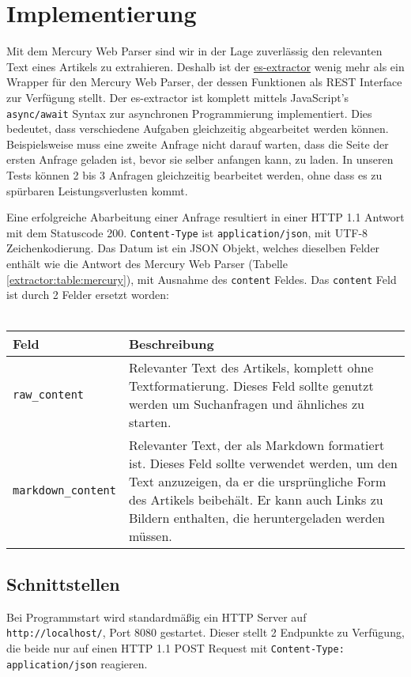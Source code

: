 \section{Implementierung} \label{extractor:sec:impl}
Mit dem Mercury Web Parser sind wir in der Lage zuverlässig den relevanten Text eines Artikels zu extrahieren.
Deshalb ist der \hyperref{https://github.com/elastifeed/es-extractor/}{}{}{es-extractor} wenig mehr als ein Wrapper für den Mercury Web Parser, der dessen Funktionen als REST Interface zur Verfügung stellt. Der es-extractor ist komplett mittels JavaScript's \texttt{async/await} Syntax zur asynchronen Programmierung implementiert. Dies bedeutet, dass verschiedene Aufgaben gleichzeitig abgearbeitet werden können. Beispielsweise muss eine zweite Anfrage nicht darauf warten, dass die Seite der ersten Anfrage geladen ist, bevor sie selber anfangen kann, zu laden. In unseren Tests können 2 bis 3 Anfragen gleichzeitig bearbeitet werden, ohne dass es zu spürbaren Leistungsverlusten kommt. \par
Eine erfolgreiche Abarbeitung einer Anfrage resultiert in einer HTTP 1.1 Antwort mit dem Statuscode 200. \verb|Content-Type| ist \verb|application/json|, mit UTF-8 Zeichenkodierung. Das Datum ist ein \ac{JSON} Objekt, welches dieselben Felder enthält wie die Antwort des Mercury Web Parser (Tabelle \ref{extractor:table:mercury}), mit Ausnahme des \verb|content| Feldes. Das \verb|content| Feld ist durch 2 Felder ersetzt worden: \\ \\
	\begin{tabu}{lX}
		\toprule
		Feld & Beschreibung \\ \midrule
		\texttt{raw\_content} & Relevanter Text des Artikels, komplett ohne Textformatierung. Dieses Feld sollte genutzt werden um Suchanfragen und ähnliches zu starten. \\
		\midrule
		\texttt{markdown\_content} & Relevanter Text, der als Markdown \cite{markdown2016} formatiert ist. Dieses Feld sollte verwendet werden, um den Text anzuzeigen, da er die ursprüngliche Form des Artikels beibehält. Er kann auch Links zu Bildern enthalten, die heruntergeladen werden müssen. \\
		\bottomrule
	\end{tabu}
\subsection{Schnittstellen}
Bei Programmstart wird standardmäßig ein HTTP Server auf \verb|http://localhost/|, Port 8080 gestartet. Dieser stellt 2 Endpunkte zu Verfügung, die beide nur auf einen HTTP 1.1 POST Request mit \verb|Content-Type: application/json| reagieren. 

